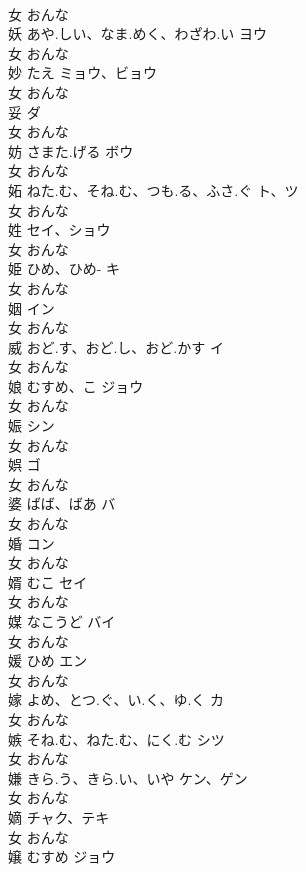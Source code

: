 \documentclass[8pt]{extreport}
\begin{document}
\begin{CJK}{UTF8}{min}
\\	女		おんな		
\\	妖	あや.しい、なま.めく、わざわ.い	ヨウ	
\\	女		おんな		
\\	妙	たえ	ミョウ、ビョウ	
\\	女		おんな		
\\	妥		ダ	
\\	女		おんな		
\\	妨	さまた.げる	ボウ	
\\	女		おんな		
\\	妬	ねた.む、そね.む、つも.る、ふさ.ぐ	ト、ツ	
\\	女		おんな		
\\	姓		セイ、ショウ	
\\	女		おんな		
\\	姫	ひめ、ひめ-	キ	
\\	女		おんな		
\\	姻		イン	
\\	女		おんな		
\\	威	おど.す、おど.し、おど.かす	イ	
\\	女		おんな		
\\	娘	むすめ、こ	ジョウ	
\\	女		おんな		
\\	娠		シン	
\\	女		おんな		
\\	娯		ゴ	
\\	女		おんな		
\\	婆	ばば、ばあ	バ	
\\	女		おんな		
\\	婚		コン	
\\	女		おんな		
\\	婿	むこ	セイ	
\\	女		おんな		
\\	媒	なこうど	バイ	
\\	女		おんな		
\\	媛	ひめ	エン	
\\	女		おんな		
\\	嫁	よめ、とつ.ぐ、い.く、ゆ.く	カ	
\\	女		おんな		
\\	嫉	そね.む、ねた.む、にく.む	シツ	
\\	女		おんな		
\\	嫌	きら.う、きら.い、いや	ケン、ゲン	
\\	女		おんな		
\\	嫡		チャク、テキ	
\\	女		おんな		
\\	嬢	むすめ	ジョウ	

\end{CJK}
\end{document}
